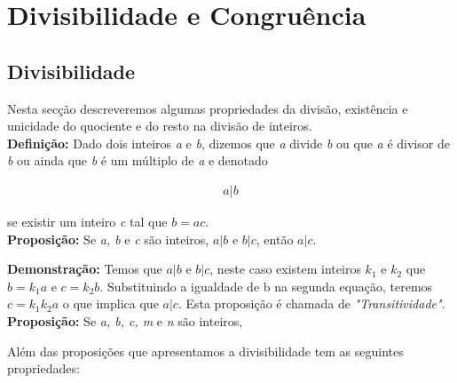 \begin{exem}
	
\end{exem}

 
 
 
 	\section{Divisibilidade e Congruência}
 	
    	\subsection{Divisibilidade}

Nesta secção descreveremos algumas propriedades da divisão, existência e unicidade do quociente e do resto na divisão de inteiros. \\

\noindent \textbf{Definição:} Dado dois inteiros \textit{a} e \textit{b}, dizemos que \textit{a} divide \textit{b} ou que \textit{a} é divisor de \textit{b} ou ainda que \textit{b} é um múltiplo de \textit{a} e denotado 

\begin{align*}
  a|b
\end{align*}

\noindent se existir um inteiro \textit{c} tal que $b = ac$.    \\
    
\noindent \textbf{Proposição:} Se \textit{a, b} e \textit{c} são inteiros, $a|b$ e $b|c$, então $a|c$. 

\noindent \textbf{Demonstração:} Temos que $a|b$ e $b|c$, neste caso existem inteiros $k_1$ e $k_2$ que $b = k_1a$ e $c = k_2b$. Substituindo a igualdade de b na segunda equação, teremos $c = k_1k_2a$ o que implica que $a|c$. Esta proposição é chamada de \textit{"Transitividade"}. \\

\noindent \textbf{Proposição:} Se \textit{a, b, c, m} e \textit{n} são inteiros, 

Além das proposições que apresentamos a divisibilidade tem as seguintes propriedades:

